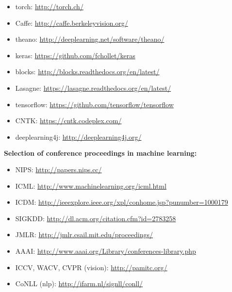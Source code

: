 \documentclass[12pt]{article}
\begin{document}
\begin{itemize}\setlength\itemsep{0em}
\item torch: \url{http://torch.ch/}
\item Caffe: \url{http://caffe.berkeleyvision.org/}
\item theano: \url{http://deeplearning.net/software/theano/}
\item keras: \url{https://github.com/fchollet/keras}
\item blocks: \url{http://blocks.readthedocs.org/en/latest/}
\item Lasagne: \url{https://lasagne.readthedocs.org/en/latest/}
\item tensorflow: \url{https://github.com/tensorflow/tensorflow}
\item CNTK: \url{https://cntk.codeplex.com/}
\item deeplearning4j: \url{http://deeplearning4j.org/}
\end{itemize}

\vspace{0.2cm}

{\bf Selection of conference proceedings in machine learning:}

\begin{itemize}\setlength\itemsep{0em}
\item NIPS: \url{http://papers.nips.cc/}
\item ICML: \url{http://www.machinelearning.org/icml.html}
\item ICDM: \url{http://ieeexplore.ieee.org/xpl/conhome.jsp?punumber=1000179}
\item SIGKDD: \url{http://dl.acm.org/citation.cfm?id=2783258}
\item JMLR: \url{http://jmlr.csail.mit.edu/proceedings/}
\item AAAI: \url{http://www.aaai.org/Library/conferences-library.php}
\item ICCV, WACV, CVPR (vision): \url{http://pamitc.org/}
\item CoNLL (nlp): \url{http://ifarm.nl/signll/conll/}
\end{itemize}
\end{document}
